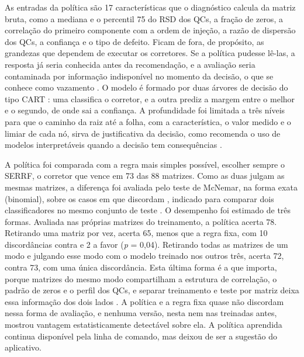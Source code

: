As entradas da política são 17 características que o diagnóstico calcula da matriz bruta, como a mediana e o percentil 75 do RSD dos QCs, a fração de zeros, a correlação do primeiro componente com a ordem de injeção, a razão de dispersão dos QCs, a confiança e o tipo de defeito. Ficam de fora, de propósito, as grandezas que dependem de executar os corretores. Se a política pudesse lê-las, a resposta já seria conhecida antes da recomendação, e a avaliação seria contaminada por informação indisponível no momento da decisão, o que se conhece como vazamento \cite{kaufman2012leakage}. O modelo é formado por duas árvores de decisão do tipo CART \cite{breiman1984classification}: uma classifica o corretor, e a outra prediz a margem entre o melhor e o segundo, de onde sai a confiança. A profundidade foi limitada a três níveis para que o caminho da raiz até a folha, com a característica, o valor medido e o limiar de cada nó, sirva de justificativa da decisão, como recomenda o uso de modelos interpretáveis quando a decisão tem consequências \cite{rudin2019stop}.

A política foi comparada com a regra mais simples possível, escolher sempre o SERRF, o corretor que vence em 73 das 88 matrizes. Como as duas julgam as mesmas matrizes, a diferença foi avaliada pelo teste de McNemar, na forma exata (binomial), sobre os casos em que discordam \cite{mcnemar1947note}, indicado para comparar dois classificadores no mesmo conjunto de teste \cite{dietterich1998approximate}. O desempenho foi estimado de três formas. Avaliada nas próprias matrizes do treinamento, a política acerta 78. Retirando uma matriz por vez, acerta 65, menos que a regra fixa, com 10 discordâncias contra e 2 a favor (\emph{p} = 0,04). Retirando todas as matrizes de um modo e julgando esse modo com o modelo treinado nos outros três, acerta 72, contra 73, com uma única discordância. Esta última forma é a que importa, porque matrizes do mesmo modo compartilham a estrutura de correlação, o padrão de zeros e o perfil dos QCs, e separar treinamento e teste por matriz deixa essa informação dos dois lados \cite{roberts2017cross}. A política e a regra fixa quase não discordam nessa forma de avaliação, e nenhuma versão, nesta nem nas treinadas antes, mostrou vantagem estatisticamente detectável sobre ela. A política aprendida continua disponível pela linha de comando, mas deixou de ser a sugestão do aplicativo.

